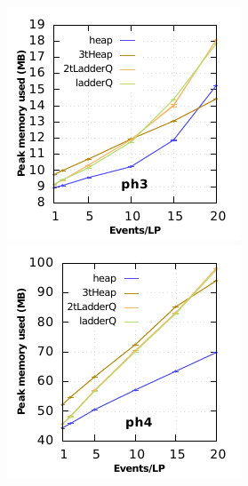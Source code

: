 \begin{figure}
\begin{minipage}{0.49\linewidth}
\includegraphics[width=\linewidth]{images/ph3_memory}
\end{minipage}
\begin{minipage}{0.49\linewidth}
\includegraphics[width=\linewidth]{images/ph4_memory}
\end{minipage}


\end{figure}
